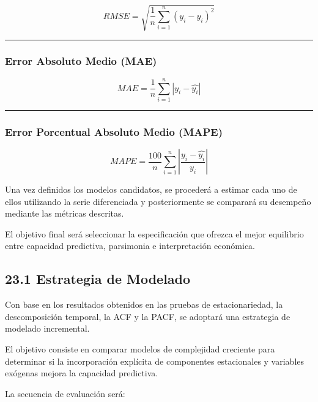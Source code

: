 \documentclass[11pt]{article}
\begin{document}
\[
RMSE =
\sqrt{
\frac{1}{n}
\sum_{i=1}^{n}
(y_i-\hat{y_i})^2
}
\]

\begin{center}\rule{0.5\linewidth}{0.5pt}\end{center}

\hypertarget{error-absoluto-medio-mae}{%
\subsubsection{Error Absoluto Medio
(MAE)}\label{error-absoluto-medio-mae}}

\[
MAE=
\frac{1}{n}
\sum_{i=1}^{n}
|y_i-\hat{y_i}|
\]

\begin{center}\rule{0.5\linewidth}{0.5pt}\end{center}

\hypertarget{error-porcentual-absoluto-medio-mape}{%
\subsubsection{Error Porcentual Absoluto Medio
(MAPE)}\label{error-porcentual-absoluto-medio-mape}}

\[
MAPE=
\frac{100}{n}
\sum_{i=1}^{n}
\left|
\frac{y_i-\hat{y_i}}
{y_i}
\right|
\]

Una vez definidos los modelos candidatos, se procederá a estimar cada
uno de ellos utilizando la serie diferenciada y posteriormente se
comparará su desempeño mediante las métricas descritas.

El objetivo final será seleccionar la especificación que ofrezca el
mejor equilibrio entre capacidad predictiva, parsimonia e interpretación
económica.

    \hypertarget{estrategia-de-modelado}{%
\subsection{23.1 Estrategia de Modelado}\label{estrategia-de-modelado}}

Con base en los resultados obtenidos en las pruebas de estacionariedad,
la descomposición temporal, la ACF y la PACF, se adoptará una estrategia
de modelado incremental.

El objetivo consiste en comparar modelos de complejidad creciente para
determinar si la incorporación explícita de componentes estacionales y
variables exógenas mejora la capacidad predictiva.

La secuencia de evaluación será:
\end{document}
